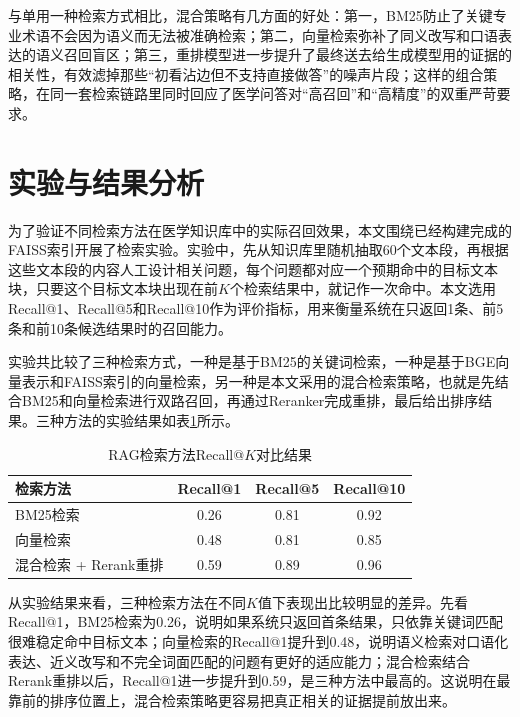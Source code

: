 与单用一种检索方式相比，混合策略有几方面的好处：第一，BM25防止了关键专业术语不会因为语义而无法被准确检索；第二，向量检索弥补了同义改写和口语表达的语义召回盲区；第三，重排模型进一步提升了最终送去给生成模型用的证据的相关性，有效滤掉那些“初看沾边但不支持直接做答”的噪声片段；这样的组合策略，在同一套检索链路里同时回应了医学问答对“高召回”和“高精度”的双重严苛要求。

\section{实验与结果分析}

为了验证不同检索方法在医学知识库中的实际召回效果，本文围绕已经构建完成的FAISS索引开展了检索实验。实验中，先从知识库里随机抽取60个文本段，再根据这些文本段的内容人工设计相关问题，每个问题都对应一个预期命中的目标文本块，只要这个目标文本块出现在前$K$个检索结果中，就记作一次命中。本文选用Recall@1、Recall@5和Recall@10作为评价指标，用来衡量系统在只返回1条、前5条和前10条候选结果时的召回能力。

实验共比较了三种检索方式，一种是基于BM25的关键词检索，一种是基于BGE向量表示和FAISS索引的向量检索，另一种是本文采用的混合检索策略，也就是先结合BM25和向量检索进行双路召回，再通过Reranker完成重排，最后给出排序结果。三种方法的实验结果如表\ref{tab:rag-recall-results}所示。

\begin{table}[htbp]
    \caption[RAG检索方法Recall@$K$对比结果]{RAG检索方法Recall@$K$对比结果}
    \centering
    \begin{tabular}{lccc}
        \toprule
        检索方法 & Recall@1 & Recall@5 & Recall@10 \\
        \midrule
        BM25检索 & 0.26 & 0.81 & 0.92 \\
        向量检索 & 0.48 & 0.81 & 0.85 \\
        混合检索 + Rerank重排 & 0.59 & 0.89 & 0.96 \\
        \bottomrule
    \end{tabular}
    \label{tab:rag-recall-results}
\end{table}

从实验结果来看，三种检索方法在不同$K$值下表现出比较明显的差异。先看Recall@1，BM25检索为0.26，说明如果系统只返回首条结果，只依靠关键词匹配很难稳定命中目标文本；向量检索的Recall@1提升到0.48，说明语义检索对口语化表达、近义改写和不完全词面匹配的问题有更好的适应能力；混合检索结合Rerank重排以后，Recall@1进一步提升到0.59，是三种方法中最高的。这说明在最靠前的排序位置上，混合检索策略更容易把真正相关的证据提前放出来。


